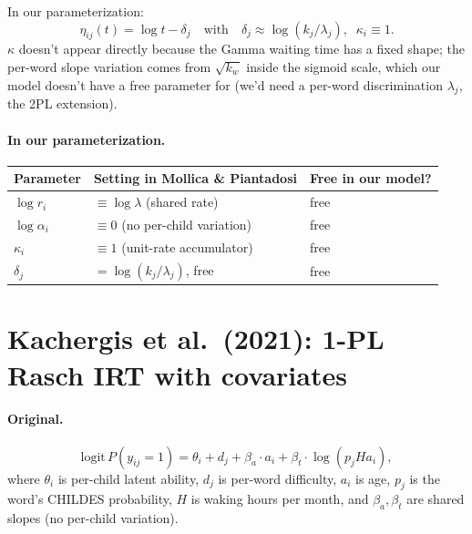 \documentclass[11pt]{article}
\begin{document}
In our parameterization:
\begin{equation}
\eta_{ij}(t) = \log t - \delta_j
\quad\text{with}\quad
\delta_j \approx \log(k_j/\lambda_j),\;\;
\kappa_i \equiv 1.
\end{equation}
$\kappa$ doesn't appear directly because the Gamma waiting time has
a fixed shape; the per-word slope variation comes from $\sqrt{k_w}$
inside the sigmoid scale, which our model doesn't have a free
parameter for (we'd need a per-word discrimination $\lambda_j$, the
2PL extension).

\paragraph{In our parameterization.}

\begin{center}
\renewcommand{\arraystretch}{1.10}
\begin{tabular}{@{}lll@{}}
\toprule
\textbf{Parameter} & \textbf{Setting in Mollica \& Piantadosi} & \textbf{Free in our model?} \\
\midrule
$\log r_i$         & $\equiv \log \lambda$ (shared rate) & free \\
$\log \alpha_i$    & $\equiv 0$ (no per-child variation) & free \\
$\kappa_i$         & $\equiv 1$ (unit-rate accumulator) & free \\
$\delta_j$         & $= \log(k_j/\lambda_j)$, free       & free \\
\bottomrule
\end{tabular}
\end{center}

\section{Kachergis et al.\ (2021): 1-PL Rasch IRT with covariates}

\paragraph{Original.}
\begin{equation}
\mathrm{logit}\,P(y_{ij}=1) = \theta_i + d_j + \beta_a\cdot a_i + \beta_t\cdot \log(p_j H a_i),
\end{equation}
where $\theta_i$ is per-child latent ability, $d_j$ is per-word
difficulty, $a_i$ is age, $p_j$ is the word's CHILDES probability,
$H$ is waking hours per month, and $\beta_a, \beta_t$ are shared
slopes (no per-child variation).
\end{document}
